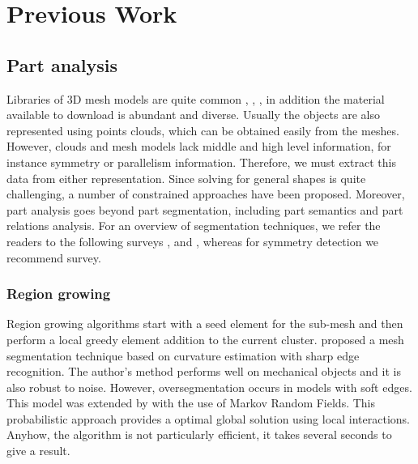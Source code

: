 \chapter{Previous Work}
\label{ch:prevWork}

\section{Part analysis}
\label{sec:partAnalysis}

Libraries of 3D mesh models are quite common \cite{Trimble2014}, \cite{GrabCAD2014}, \cite{Autodesk2014}, in addition the material available to download is abundant and diverse.   
Usually the objects are also represented using points clouds, which can be obtained easily from the meshes.
However, clouds and mesh models lack middle and high level information, for instance symmetry or parallelism information.
Therefore, we must extract this data from either representation.
Since solving for general shapes is quite challenging, a number of constrained approaches have been proposed.
Moreover, part analysis goes beyond part segmentation, including part semantics and part relations analysis. 
For an overview of segmentation techniques, we refer the readers to the following surveys \cite{Varady1997}, \cite{Agathos2007} and \cite{Shamir2008}, whereas for symmetry detection we recommend \cite{Mitra2013} survey.

\subsection{Region growing}

Region growing algorithms start with a seed element for the sub-mesh and then perform a local greedy element addition to the current cluster.
\cite{Mizoguchi2006} proposed a mesh segmentation technique based on curvature estimation with sharp edge recognition.
The author's method performs well on mechanical objects and it is also robust to noise.
However, oversegmentation occurs in models with soft edges.
This model was extended by \cite{Lavoue2008} with the use of Markov Random Fields.
This probabilistic approach provides a optimal global solution using local interactions.
Anyhow, the algorithm is not particularly efficient, it takes several seconds to give a result.


